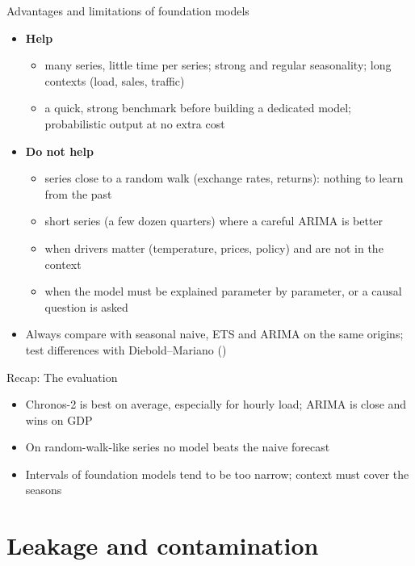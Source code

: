 \begin{frame}{Advantages and limitations of foundation models}
\itemsize{\footnotesize}
\begin{itemize}
    \item \textbf{Help}
    \begin{itemize}
        \item many series, little time per series; strong and regular seasonality; long contexts (load, sales, traffic)
        \item a quick, strong benchmark before building a dedicated model; probabilistic output at no extra cost
    \end{itemize}
    \item \textbf{Do not help}
    \begin{itemize}
        \item series close to a random walk (exchange rates, returns): nothing to learn from the past
        \item short series (a few dozen quarters) where a careful ARIMA is better
        \item when drivers matter (temperature, prices, policy) and are not in the context
        \item when the model must be explained parameter by parameter, or a causal question is asked
    \end{itemize}
    \item Always compare with seasonal naive, ETS and ARIMA on the same origins; test differences with Diebold--Mariano ()
\end{itemize}
\end{frame}

\begin{frame}{Recap: The evaluation}
\itemsize{\small}
\begin{itemize}
    \item Chronos-2 is best on average, especially for hourly load; ARIMA is close and wins on GDP
    \item On random-walk-like series no model beats the naive forecast
    \item Intervals of foundation models tend to be too narrow; context must cover the seasons
\end{itemize}
\end{frame}


\section{Leakage and contamination}

